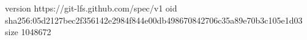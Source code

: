 version https://git-lfs.github.com/spec/v1
oid sha256:05d2127bec2f356142e2984f844e00db498670842706c35a89e70b3c105e1d03
size 1048672
